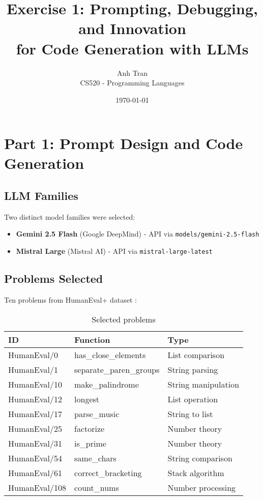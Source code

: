 \documentclass[11pt]{article}
\title{Exercise 1: Prompting, Debugging, and Innovation\\for Code Generation with LLMs}
\author{Anh Tran \\ CS520 - Programming Languages}
\date{\today}
\begin{document}
\maketitle

\section{Part 1: Prompt Design and Code Generation}

\subsection{LLM Families}

Two distinct model families were selected:

\begin{itemize}
    \item \textbf{Gemini 2.5 Flash} (Google DeepMind) - API via \texttt{models/gemini-2.5-flash}
    \item \textbf{Mistral Large} (Mistral AI) - API via \texttt{mistral-large-latest}
\end{itemize}

\subsection{Problems Selected}

Ten problems from HumanEval+ dataset \cite{humanevalplus}:

\begin{table}[h]
\centering
\small
\begin{tabular}{lll}
\toprule
\textbf{ID} & \textbf{Function} & \textbf{Type} \\
\midrule
HumanEval/0 & has\_close\_elements & List comparison \\
HumanEval/1 & separate\_paren\_groups & String parsing \\
HumanEval/10 & make\_palindrome & String manipulation \\
HumanEval/12 & longest & List operation \\
HumanEval/17 & parse\_music & String to list \\
HumanEval/25 & factorize & Number theory \\
HumanEval/31 & is\_prime & Number theory \\
HumanEval/54 & same\_chars & String comparison \\
HumanEval/61 & correct\_bracketing & Stack algorithm \\
HumanEval/108 & count\_nums & Number processing \\
\bottomrule
\end{tabular}
\caption{Selected problems}
\end{table}
\end{document}
